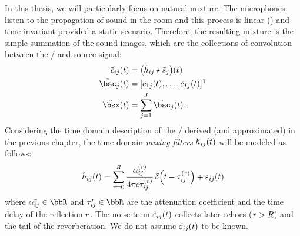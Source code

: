 \mynewline
In this thesis, we will particularly focus on natural mixture.
The microphones listen to the propagation of sound in the room and this process is linear () and time invariant provided a static scenario.
Therefore, the resulting mixture is the simple summation of the sound images,
which are the collections of convolution between the \RIRs/ and source signal:
\begin{align}
    \tilde{\img}_{\idxMicSrc}(t) &= \kparen{\tilde{\rir}_{\idxMicSrc} \convCont \tilde{\src}_\idxSrc} (t)     \label{eq:processing:mixing:img} \\
    \tilde{\imgs}_\idxSrc(t)         &= \ktranspose{\klist{\tilde{\img}_{1\idxSrc}(t), \dots, \tilde{\img}_{\numMics\idxSrc}(t)}} \nonumber\\
    \tilde{\mics}(t)                 &= \sum_{\idxSrc=1}^{\numSrcs} \tilde{\imgs}_\idxSrc(t)                    \label{eq:processing:mixing:mix}
    .
\end{align}%
Considering the time domain description of the \RIR/ derived (and approximated) in the previous chapter,
the time-domain \emph{mixing filters} $\tilde{h}_{ij}( t)$ will be modeled as follows:
\begin{equation}\label{eq:processing:mixing_filter}
    \tilde{h}_{\idxMicSrc}( t) = \sum_{\idxEch=0}^{\numEchs} \frac{\absCoeff_{\idxMicSrc}^{(r)}}{4 \pi \speedOfSound \tau_{\idxMicSrc}^{(r)}}
                          \diracOf{t - \tau_{\idxMicSrc}^{(r)}} + \varepsilon_{\idxMicSrc}(t)
\end{equation}
where $\absCoeff_{\idxMicSrc}^r \in \R$ and $\tau_{\idxMicSrc}^r \in \R$ are the attenuation coefficient and the time delay of the reflection $r$.
The noise term $\tilde{\varepsilon}_{ij}( t)$ collects later echoes ($r > R$) and the tail of the reverberation.
We do not assume $\tilde{\varepsilon}_{ij}( t)$ to be known.

